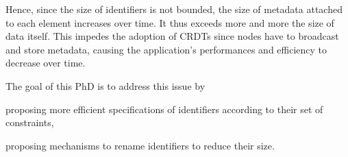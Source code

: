 \documentclass{article}
\begin{document}


Hence, since the size of identifiers is not bounded, the size of metadata attached to each element increases over time.
It thus exceeds more and more the size of data itself.
This impedes the adoption of \acp{CRDT} since nodes have to broadcast and store metadata, causing the application's performances and efficiency to decrease over time.

The goal of this PhD is to address this issue by
\begin{enumerate*}
  \item proposing more efficient specifications of identifiers according to their set of constraints,
  \item proposing mechanisms to rename identifiers to reduce their size.
\end{enumerate*}


\nocite{ShapiroSSS2011}



\end{document}
